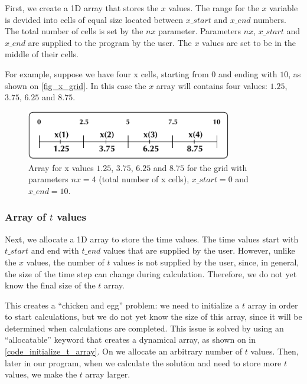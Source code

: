 First, we create a 1D array that stores the $x$ values. The range for the $x$ variable is devided into cells of equal size located between $x\_start$ and $x\_end$ numbers. The total number of cells is set by the $nx$ parameter. Parameters $nx$, $x\_start$ and $x\_end$ are supplied to the program by the user. The $x$ values are set to be in the middle of their cells.

For example, suppose we have four x cells, starting from $0$ and ending with $10$, as shown on \autoref{fig_x_grid}. In this case the $x$ array will contains four values: $1.25$, $3.75$, $6.25$ and $8.75$.

\begin{figure}[!ht]
    \centering
    \includegraphics[width=0.8\textwidth]{figures/x_grid.pdf}
    \caption{Array for x values $1.25$, $3.75$, $6.25$ and $8.75$ for the grid with parameters $nx=4$ (total number of x cells), $x\_start=0$ and $x\_end=10$.}
    \label{fig_x_grid}
\end{figure}


\subsubsection*{Array of $t$ values}

Next, we allocate a 1D array to store the time values. The time values start with $t\_start$ and end with $t\_end$ values that are supplied by the user. However, unlike the $x$ values, the number of $t$ values is not supplied by the user, since, in general, the size of the time step can change during calculation. Therefore, we do not yet know the final size of the $t$ array.

This creates a ``chicken and egg'' problem: we need to initialize a $t$ array in order to start calculations, but we do not yet know the size of this array, since it will be determined when calculations are completed. This issue is solved by using an ``allocatable'' keyword that creates a dynamical array, as shown on  in \autoref{code_initialize_t_array}. On  we allocate an arbitrary number of $t$ values. Then, later in our program, when we calculate the solution and need to store more $t$ values, we make the $t$ array larger.

